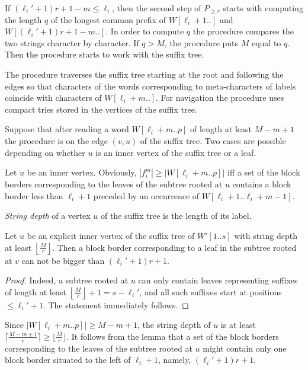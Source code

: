 \documentclass[10pt]{llncs}
\begin{document}
If $(\ell_i'+1)r+1-m \le \ell_i$, then the second step of $P_{\geq r}$ starts with computing the length $q$ of the longest common prefix of  $W[\ell_i+1..]$ and $W[(\ell_i'+1)r+1-m..]$. In order to compute $q$ the procedure compares the two strings character by character. If $q > M$, the procedure puts $M$ equal to $q$. Then the procedure starts to work with the suffix tree.

The procedure traverses the suffix tree starting at the root and following the edges so that characters of the words corresponding to meta-characters of labels coincide with characters of $W[\ell_i+m..]$. For navigation the procedure uses compact tries stored in the vertices of the suffix tree.

Suppose that after reading a word $W[\ell_i+m..p]$ of length at least $M-m+1$ the procedure is on the edge $(v,u)$ of the suffix tree. Two cases are possible depending on whether $u$ is an inner vertex of the suffix tree or a leaf.

Let $u$ be an inner vertex. Obviously, $|f_i^m| \geq |W[\ell_i+m..p]|$ iff a set of the block borders corresponding to the leaves of the subtree rooted at $u$ contains a block border less than $\ell_i+1$ preceded by an occurrence of $W[\ell_i+1..\ell_i+m-1]$.

\begin{definition}
  \emph{String depth} of a vertex $u$ of the suffix tree is the length of its label.
\end{definition}

\begin{lemma}
\label{lm:B_v_prop}
 Let $u$ be an explicit inner vertex of the suffix tree of $W'[1..s]$ with string depth at least $\left\lfloor\frac{M}{r}\right\rfloor$. Then a block border corresponding to a leaf in the subtree rooted at $v$ can not be bigger than $(\ell_i'+1)r + 1$.
\end{lemma}
\begin{proof}
  Indeed, a subtree rooted at $u$ can only contain leaves representing suffixes of length at least $\left\lfloor\frac{M}{r}\right\rfloor + 1 = s-\ell_i'$, and all such suffixes start at positions $\leq \ell_i'+1$. The statement immediately follows.
\end{proof}

Since $|W[\ell_i+m..p]| \geq M-m+1$, the string depth of $u$ is at least $\lceil\frac{M-m+1}{r}\rceil \geq \lfloor \frac{M}{r} \rfloor$. It follows from the lemma that a set of the block borders corresponding to the leaves of the subtree rooted at $u$ might contain only one block border situated to the left of $\ell_i+1$, namely, $(\ell_i'+1)r + 1$. 
\end{document}
